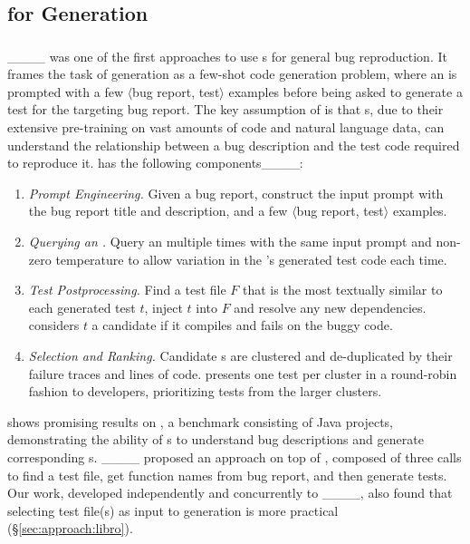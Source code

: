 \subsection{\llm for \brt Generation}
\label{sec:relatedwork:brt}

\subsubsection{\libro}
\label{sec:relatedwork:brt:libro}

\libro____ was one of the first approaches to use \llm{}s for general bug reproduction. 
It frames the task of \brt generation as a few-shot code generation problem, where an \llm is prompted with a few $\langle$bug report, test$\rangle$ examples before being asked to generate a test for the targeting bug report. 
The key assumption of \libro is that \llm{}s, due to their extensive pre-training on vast amounts of code and natural language data, can understand the relationship between a bug description and the test code required to reproduce it.
\libro has the following components____:
\begin{enumerate}
    \item \textit{Prompt Engineering.} Given a bug report, construct the input prompt with the bug report title and description, and a few $\langle$bug report, test$\rangle$ examples. 
    \item \textit{Querying an \llm.} Query an \llm multiple times with the same input prompt and non-zero temperature to allow variation in the \llm's generated test code each time.
    \item \textit{Test Postprocessing.} Find a test file $F$ that is the most textually similar to each generated test $t$, inject $t$ into $F$ and resolve any new dependencies. \libro considers $t$ a candidate \brt if it compiles and fails on the buggy code.
    \item \textit{Selection and Ranking.} Candidate \brt{}s are clustered and de-duplicated by their failure traces and lines of code. \libro presents one test per cluster in a round-robin fashion to developers, prioritizing tests from the larger clusters. 
\end{enumerate}

\libro shows promising results on , a benchmark consisting of Java projects, demonstrating the ability of \llm{}s to understand bug descriptions and generate corresponding \brt{}s.
____ proposed an approach on top of \libro, composed of three \llm calls to find a test file, get function names from bug report, and then generate tests.
Our work, developed independently and concurrently to ____, also found that selecting test file(s) as input to \brt generation is more practical (\S\ref{sec:approach:libro}).

